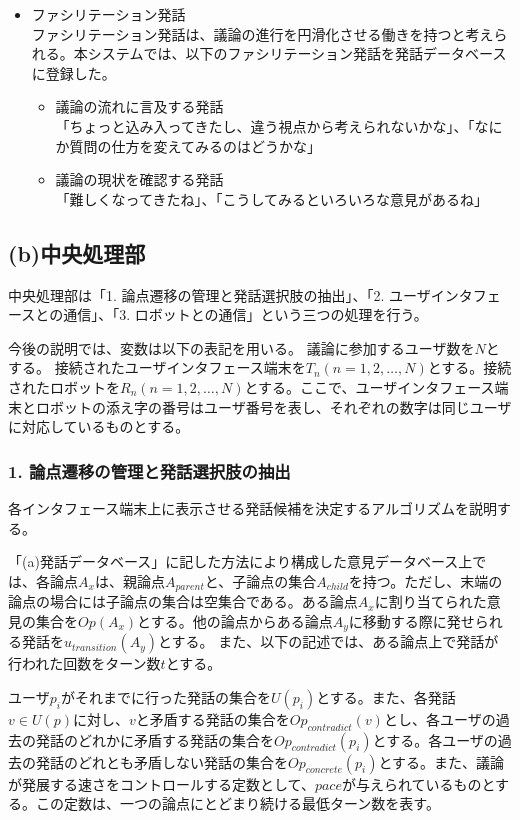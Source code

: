 \documentclass[11pt, a4paper]{jreport} %
\begin{document}
\begin{itemize}
\item ファシリテーション発話\\
ファシリテーション発話は、議論の進行を円滑化させる働きを持つと考えられる。本システムでは、以下のファシリテーション発話を発話データベースに登録した。
\begin{itemize}
\item 議論の流れに言及する発話\\
「ちょっと込み入ってきたし、違う視点から考えられないかな」、「なにか質問の仕方を変えてみるのはどうかな」
\item 議論の現状を確認する発話\\
「難しくなってきたね」、「こうしてみるといろいろな意見があるね」
\end{itemize}

\end{itemize}




\subsection*{(b)中央処理部}
中央処理部は「1. 論点遷移の管理と発話選択肢の抽出」、「2. ユーザインタフェースとの通信」、「3. ロボットとの通信」という三つの処理を行う。



今後の説明では、変数は以下の表記を用いる。
議論に参加するユーザ数を$N$とする。
接続されたユーザインタフェース端末を$T_n (n = 1, 2, \dots, N)$とする。接続されたロボットを$R_n (n = 1, 2, \dots, N)$とする。ここで、ユーザインタフェース端末とロボットの添え字の番号はユーザ番号を表し、それぞれの数字は同じユーザに対応しているものとする。


\subsubsection{1. 論点遷移の管理と発話選択肢の抽出}
各インタフェース端末上に表示させる発話候補を決定するアルゴリズムを説明する。

「(a)発話データベース」に記した方法により構成した意見データベース上では、各論点$A_x$は、親論点$A_{parent}$と、子論点の集合$A_{child}$を持つ。ただし、末端の論点の場合には子論点の集合は空集合である。ある論点$A_x$に割り当てられた意見の集合を$Op(A_x)$とする。他の論点からある論点$A_y$に移動する際に発せられる発話を$u_{transition}(A_y)$とする。
また、以下の記述では、ある論点上で発話が行われた回数をターン数$t$とする。


ユーザ$p_i$がそれまでに行った発話の集合を$U(p_i)$とする。また、各発話$v \in U(p)$に対し、$v$と矛盾する発話の集合を$Op_{contradict}(v)$とし、各ユーザの過去の発話のどれかに矛盾する発話の集合を$Op_{contradict}(p_i)$とする。各ユーザの過去の発話のどれとも矛盾しない発話の集合を$Op_{concrete}(p_i)$とする。また、議論が発展する速さをコントロールする定数として、$pace$が与えられているものとする。この定数は、一つの論点にとどまり続ける最低ターン数を表す。
\end{document}
